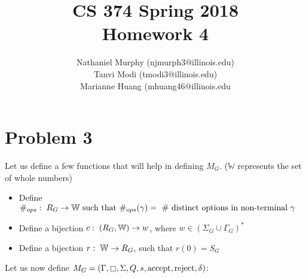 \documentclass[11pt]{article}
\title{\textbf{CS 374 Spring 2018\\Homework 4}}
\author{Nathaniel Murphy (njmurph3@illinois.edu)\\
			Tanvi Modi (tmodi3@illinois.edu)\\
			Marianne Huang (mhuang46@illinois.edu}
\date{}
\begin{document}
\maketitle
\section*{Problem 3}
Let us define a few functions that will help in defining $M_G$. ($\mathbb{W}$ represents the set of whole numbers)
\begin{itemize}
	\item Define $\#_{ops}:\hspace{1mm}R_G\rightarrow\mathbb{W}\text{ such that }\#_{ops}(\gamma)=\text{ \# distinct options in non-terminal }\gamma$
	\item Define a bijection $c:\hspace{1mm}(R_G,\mathbb{W})\rightarrow w$, where $w\in(\Sigma_G\cup\Gamma_G)^*$
	\item Define a bijection $r:\hspace{1mm}\mathbb{W}\rightarrow R_G$, such that $r(0)=S_G$
\end{itemize}
Let us now define $M_G=(\Gamma,\boxempty,\Sigma,Q,s,\text{accept},\text{reject},\delta)$:
\end{document}
